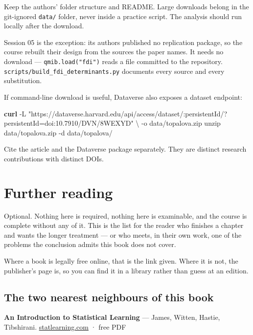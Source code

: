 \documentclass[
  letterpaper,
  10pt,
  twoside,
  openright,
  numbers=noenddot,
  chapterprefix=true]{scrbook}
\newenvironment{Shaded}{}{}
\newcommand{\AttributeTok}[1]{\textcolor[rgb]{0.84,0.23,0.29}{#1}}
\newcommand{\DataTypeTok}[1]{\textcolor[rgb]{0.84,0.23,0.29}{#1}}
\newcommand{\ExtensionTok}[1]{\textcolor[rgb]{0.84,0.23,0.29}{\textbf{#1}}}
\newcommand{\FunctionTok}[1]{\textcolor[rgb]{0.44,0.26,0.76}{#1}}
\newcommand{\NormalTok}[1]{\textcolor[rgb]{0.14,0.16,0.18}{#1}}
\newcommand{\StringTok}[1]{\textcolor[rgb]{0.01,0.18,0.38}{#1}}
\begin{document}
Keep the authors' folder structure and README. Large downloads belong in
the git-ignored \texttt{data/} folder, never inside a practice script.
The analysis should run locally after the download.

Session 05 is the exception: its authors published no replication
package, so the course rebuilt their design from the sources the paper
names. It needs no download --- \texttt{qmib.load("fdi")} reads a file
committed to the repository.
\texttt{scripts/build\_fdi\_determinants.py} documents every source and
every substitution.

If command-line download is useful, Dataverse also exposes a dataset
endpoint:

\begin{Shaded}
\begin{Highlighting}[]
\ExtensionTok{curl} \AttributeTok{{-}L} \StringTok{"https://dataverse.harvard.edu/api/access/dataset/:persistentId/?persistentId=doi:10.7910/DVN/8WEXYD"} \DataTypeTok{\textbackslash{}}
  \AttributeTok{{-}o}\NormalTok{ data/topalova.zip}
\FunctionTok{unzip}\NormalTok{ data/topalova.zip }\AttributeTok{{-}d}\NormalTok{ data/topalova/}
\end{Highlighting}
\end{Shaded}

Cite the article and the Dataverse package separately. They are distinct
research contributions with distinct DOIs.

\chapter{Further reading}\label{further-reading}

Optional. Nothing here is required, nothing here is examinable, and the
course is complete without any of it. This is the list for the reader
who finishes a chapter and wants the longer treatment --- or who meets,
in their own work, one of the problems the conclusion admits this book
does not cover.

Where a book is legally free online, that is the link given. Where it is
not, the publisher's page is, so you can find it in a library rather
than guess at an edition.

\section{The two nearest neighbours of this
book}\label{the-two-nearest-neighbours-of-this-book}

\textbf{An Introduction to Statistical Learning} --- James, Witten,
Hastie, Tibshirani.
\href{https://www.statlearning.com/}{statlearning.com} · free PDF
\end{document}
